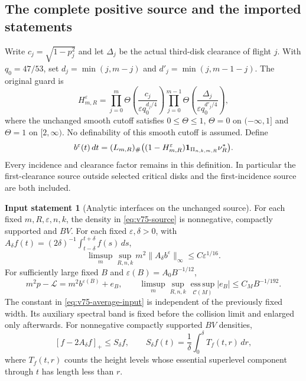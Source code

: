 \documentclass[11pt,reqno]{amsart}
\numberwithin{equation}{section}
\theoremstyle{definition}\newtheorem{definition}[theorem]{Definition}
\theoremstyle{remark}\newtheorem{remark}[theorem]{Remark}
\theoremstyle{definition}\newtheorem{inputstatement}[theorem]{Input statement}
\newcommand{\esssup}{\operatorname*{ess\,sup}}
\begin{document}
\subsection{The complete positive source and the imported statements}
Write $c_j=\sqrt{1-p_j^2}$ and let $\Delta_j$ be the actual
third-disk clearance of flight $j$. With $q_0=47/53$, set
$d_j=\min(j,m-j)$ and $d'_j=\min(j,m-1-j)$. The original guard is
\[
 H_{m,R}^\varepsilon=
 \prod_{j=0}^{m}\Theta\!\left(\frac{c_j}{\varepsilon q_0^{d_j/4}}\right)
 \prod_{j=0}^{m-1}\Theta\!\left(\frac{\Delta_j}{\varepsilon q_0^{d'_j/4}}\right),
\]
where the unchanged smooth cutoff satisfies $0\le\Theta\le1$,
$\Theta=0$ on $(-\infty,1]$ and $\Theta=1$ on $[2,\infty)$.
No definability of this smooth cutoff is assumed. Define
\begin{equation}\label{eq:v75-source}
 b^\varepsilon(t)\,dt
   =(L_{m,R})_\#\bigl((1-H_{m,R}^\varepsilon)
                         \one_{\Pi_{n,k,m,R}}\nu_R^*\bigr).
\end{equation}
Every incidence and clearance factor remains in this definition.
In particular the first-clearance source outside selected critical
disks and the first-incidence source are both included.

\begin{inputstatement}[Analytic interfaces on the unchanged source]
\label{input:v75-analytic}
For each fixed $m,R,\varepsilon,n,k$, the density in
\eqref{eq:v75-source} is nonnegative, compactly supported and $BV$.
For each fixed $\varepsilon,\delta>0$, with
$A_\delta f(t)=(2\delta)^{-1}\int_{t-\delta}^{t+\delta}f(s)\,ds$,
\begin{equation}\label{eq:v75-average-input}
 \limsup_m\sup_{R,n,k}m^2\|A_\delta b^\varepsilon\|_\infty
                                  \le C\varepsilon^{1/16}.
\end{equation}
For sufficiently large fixed $B$ and $\varepsilon(B)=A_0B^{-1/12}$,
\begin{equation}\label{eq:v75-positive-input}
 m^2p-\mathcal L=m^2b^{\varepsilon(B)}+e_B,\qquad
 \limsup_m\sup_{R,n,k}\esssup_{\mathcal C(M)}|e_B|
                                  \le C_MB^{-1/192}.
\end{equation}
The constant in \eqref{eq:v75-average-input} is independent of the
previously fixed width. Its auxiliary spectral band is fixed before
the collision limit and enlarged only afterwards. For nonnegative
compactly supported $BV$ densities,
\[
 [f-2A_\delta f]_+\le S_\delta f,\qquad
 S_\delta f(t)=\frac1\delta\int_0^\delta T_f(t,r)\,dr,
\]
where $T_f(t,r)$ counts the height levels whose essential superlevel
component through $t$ has length less than $r$.
\end{inputstatement}
\end{document}
